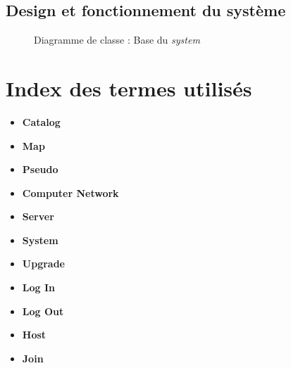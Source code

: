 \documentclass[a4paper,11pt]{report}
\begin{document}
\section{Design et fonctionnement du système}
\begin{figure}[ht]
    \caption{Diagramme de classe : Base du \textit{system}}
\end{figure}


\newpage
\chapter{Index des termes utilisés}
\begin{itemize}
 \item \textbf{Catalog}
 \item \textbf{Map}
 \item \textbf{Pseudo}
 \item \textbf{Computer Network}
 \item \textbf{Server}
 \item \textbf{System}
 \item \textbf{Upgrade}
 \item \textbf{Log In}
 \item \textbf{Log Out}
 \item \textbf{Host}
 \item \textbf{Join}
\end{itemize}
\end{document}
